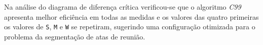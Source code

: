 Na análise do diagrama de diferença crítica verificou-se que o algoritmo \textit{C99} apresenta melhor eficiência em todas as medidas e os valores das quatro primeiras os valores de \texttt{S}, \texttt{M} e \texttt{W} se repetiram, sugerindo uma configuração otimizada para o problema da segmentação de atas de reunião.






